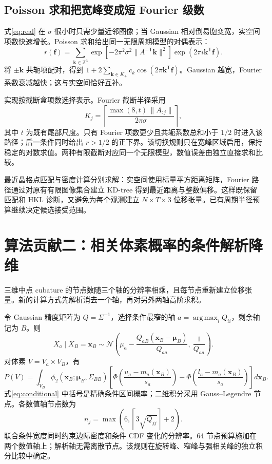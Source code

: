 \documentclass[UTF8,11pt,a4paper,fontset=fandol]{ctexart}
\newcommand{\N}{\mathcal{N}}
\newcommand{\T}{\mathsf{T}}
\newcommand{\argmax}{\operatorname*{arg\,max}}
\begin{document}
\subsection{Poisson 求和把宽峰变成短 Fourier 级数}
式\eqref{eq:real} 在 $\sigma$ 很小时只需少量近邻图像；当 Gaussian 相对倒易胞变宽，实空间项数快速增长。Poisson 求和给出同一无限周期模型的对偶表示：
\begin{equation}\label{eq:fourier}
r(\bm f)=\sum_{\bm k\in\mathbb Z^3}
\exp\left[-2\pi^2\sigma^2\|A^{-\T}\bm k\|^2\right]
\exp(2\pi i\bm k^\T\bm f).
\end{equation}
将 $\pm\bm k$ 共轭项配对，得到 $1+2\sum_{\bm k\in K_+}c_k\cos(2\pi\bm k^\T\bm f)$。Gaussian 越宽，Fourier 系数衰减越快；这与实空间恰好互补。

实现按截断盒项数选择表示。Fourier 截断半径采用
\begin{equation}
K_j=\left\lceil\frac{\max(8,t)\,\|A_{:j}\|}{2\pi\sigma}\right\rceil,
\end{equation}
其中 $t$ 为既有尾部尺度。只有 Fourier 项数更少且共轭系数总和小于 $1/2$ 时进入该路径；后一条件同时给出 $r>1/2$ 的正下界。该切换规则只在宽峰区域启用，保持稳定的对数求值。两种有限截断对应同一个无限模型，数值误差由独立直接求和比较。

最近晶格点匹配与密度计算分别求解：实空间使用标量平方距离矩阵，Fourier 路径通过对原有有限图像集合建立 KD-tree 得到最近距离与整数偏移。这样既保留匹配和 HKL 诊断，又避免为每个观测建立 $N\times T\times3$ 位移张量。已有周期半径预算继续决定候选接受范围。

\section{算法贡献二：相关体素概率的条件解析降维}
三维中点 cubature 的节点数随三个轴的分辨率相乘，且每节点重新建立位移张量。新的计算方式先解析消去一个轴，再对另外两轴高阶求积。

令 Gaussian 精度矩阵为 $Q=\Sigma^{-1}$，选择条件最窄的轴 $a=\argmax_iQ_{ii}$，剩余轴记为 $B$。则
\begin{equation}
X_a\mid X_B=\bm x_B\sim\N\!\left(
\mu_a-\frac{Q_{aB}(\bm x_B-\bm\mu_B)}{Q_{aa}},\ \frac1{Q_{aa}}\right).
\end{equation}
对体素 $V=V_a\times V_B$，有
\begin{equation}\label{eq:conditional}
P(V)=\int_{V_B}\phi_2(\bm x_B;\bm\mu_B,\Sigma_{BB})
\left[\Phi\!\left(\frac{u_a-m_a(\bm x_B)}{s_a}\right)
-\Phi\!\left(\frac{l_a-m_a(\bm x_B)}{s_a}\right)\right]d\bm x_B.
\end{equation}
式\eqref{eq:conditional} 中括号是精确条件区间概率；二维积分采用 Gauss--Legendre 节点。各数值轴节点数为
\begin{equation}
n_j=\max\!\left(6,\left\lceil3\sqrt{Q_{jj}}\right\rceil+2\right).
\end{equation}
联合条件宽度同时约束边际密度和条件 CDF 变化的分辨率。64 节点预算施加在两个数值轴上；解析轴无需离散节点。该规则在旋转峰、窄峰与强相关峰的独立积分比较中确定。
\end{document}
